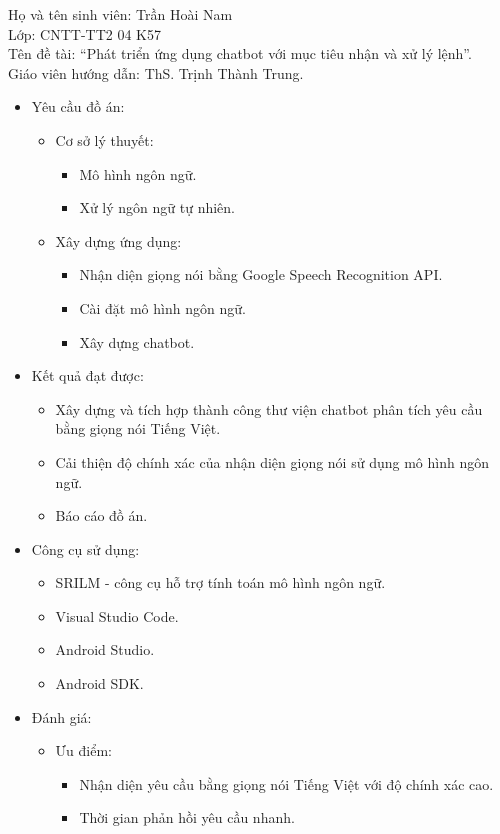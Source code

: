 \documentclass[12pt]{report}
\newcommand{\thesistitle}{Phát triển ứng dụng chatbot với mục tiêu nhận và xử lý lệnh}
\begin{document}
\noindent Họ và tên sinh viên: Trần Hoài Nam \\
Lớp: CNTT-TT2 04 K57\\
Tên đề tài: ``\thesistitle{}''.\\
Giáo viên hướng dẫn: ThS. Trịnh Thành Trung.
\begin{itemize}
	\item Yêu cầu đồ án:
		\begin{itemize}
			\item Cơ sở lý thuyết:
			\begin{itemize}
				\item Mô hình ngôn ngữ.
				\item Xử lý ngôn ngữ tự nhiên.
			\end{itemize}
			\item Xây dựng ứng dụng:
			\begin{itemize}
				\item Nhận diện giọng nói bằng Google Speech Recognition API.
				\item Cài đặt mô hình ngôn ngữ.
				\item Xây dựng chatbot.
			\end{itemize}
		\end{itemize}
	\item Kết quả đạt được:
		\begin{itemize}
			\item Xây dựng và tích hợp thành công thư viện chatbot phân tích yêu cầu bằng giọng nói Tiếng Việt.
			\item Cải thiện độ chính xác của nhận diện giọng nói sử dụng mô hình ngôn ngữ.
			\item Báo cáo đồ án.
		\end{itemize}
	\item Công cụ sử dụng:
		\begin{itemize}
			\item SRILM - công cụ hỗ trợ tính toán mô hình ngôn ngữ.
			\item Visual Studio Code.
			\item Android Studio.
			\item Android SDK.
		\end{itemize}
	\item Đánh giá:
	\begin{itemize}
		\item Ưu điểm:
		\begin{itemize}
			\item Nhận diện yêu cầu bằng giọng nói Tiếng Việt với độ chính xác cao.
			\item Thời gian phản hồi yêu cầu nhanh.

\end{itemize}
\end{itemize}
\end{itemize}
\end{document}
